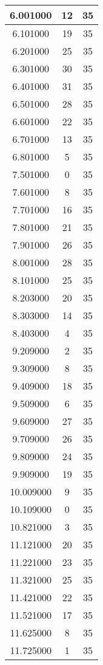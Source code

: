 \begin{longtable}[htbp]{|c|c|c|}
6.001000 & 12 & 35 \\ \hline
6.101000 & 19 & 35 \\ \hline
6.201000 & 25 & 35 \\ \hline
6.301000 & 30 & 35 \\ \hline
6.401000 & 31 & 35 \\ \hline
6.501000 & 28 & 35 \\ \hline
6.601000 & 22 & 35 \\ \hline
6.701000 & 13 & 35 \\ \hline
6.801000 & 5 & 35 \\ \hline
7.501000 & 0 & 35 \\ \hline
7.601000 & 8 & 35 \\ \hline
7.701000 & 16 & 35 \\ \hline
7.801000 & 21 & 35 \\ \hline
7.901000 & 26 & 35 \\ \hline
8.001000 & 28 & 35 \\ \hline
8.101000 & 25 & 35 \\ \hline
8.203000 & 20 & 35 \\ \hline
8.303000 & 14 & 35 \\ \hline
8.403000 & 4 & 35 \\ \hline
9.209000 & 2 & 35 \\ \hline
9.309000 & 8 & 35 \\ \hline
9.409000 & 18 & 35 \\ \hline
9.509000 & 6 & 35 \\ \hline
9.609000 & 27 & 35 \\ \hline
9.709000 & 26 & 35 \\ \hline
9.809000 & 24 & 35 \\ \hline
9.909000 & 19 & 35 \\ \hline
10.009000 & 9 & 35 \\ \hline
10.109000 & 0 & 35 \\ \hline
10.821000 & 3 & 35 \\ \hline
11.121000 & 20 & 35 \\ \hline
11.221000 & 23 & 35 \\ \hline
11.321000 & 25 & 35 \\ \hline
11.421000 & 22 & 35 \\ \hline
11.521000 & 17 & 35 \\ \hline
11.625000 & 8 & 35 \\ \hline
11.725000 & 1 & 35 \\ \hline
\end{longtable}
